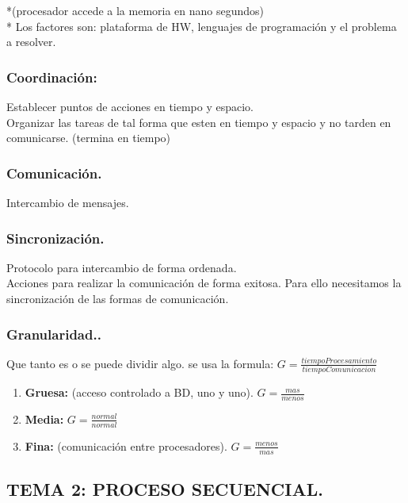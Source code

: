 \documentclass[12pt]{article}
\begin{document}
*(procesador accede a la memoria en nano segundos)\\
* Los factores son: plataforma de HW, lenguajes de programación y el problema a resolver.
\vspace{2em}

{\color{blue} \subsubsection*{\textbf{Coordinación:}}}
Establecer puntos de acciones en tiempo y espacio.\\
Organizar las tareas de tal forma que esten en tiempo y espacio y no tarden en comunicarse. (termina en tiempo) 
\vspace{1em}

{\color{blue} \subsubsection*{\textbf{Comunicación.}}}
Intercambio de mensajes.
\vspace{1em}

{\color{blue} \subsubsection*{\textbf{Sincronización.}}}
Protocolo para intercambio de forma ordenada.\\
Acciones para realizar la comunicación de forma exitosa. Para ello necesitamos la sincronización de las formas de comunicación.
\vspace{1em}

{\color{blue} \subsubsection*{\textbf{Granularidad..}}}
Que tanto es o se puede dividir algo. se usa la formula:  $G=\frac{tiempoProcesamiento}{tiempoComunicacion}$ \\
\begin{enumerate}
    \item \textbf{Gruesa:} (acceso controlado a BD, uno y uno). $G=\frac{mas}{menos}$
    \item \textbf{Media:} $G=\frac{normal}{normal}$
    \item \textbf{Fina:} (comunicación entre procesadores). $G=\frac{menos}{mas}$
\end{enumerate}
\vspace{1em}

{\color{blue} \subsection*{\textbf{TEMA 2: PROCESO SECUENCIAL.}}}
\vspace{1em}
\end{document}
